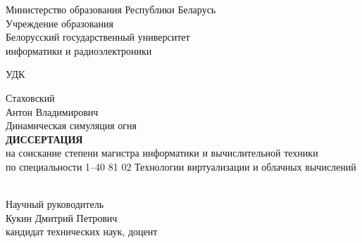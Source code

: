 \begin{titlepage}
    \begin{center}
        Министерство образования Республики Беларусь \\
        Учреждение образования \\
        Белорусский государственный университет \\
        информатики и радиоэлектроники \\[4em]
    \end{center}

    \begin{raggedright}
        \begin{minipage}{4cm}
            УДК\hrulefill{} \\[1em]
        \end{minipage}
    \end{raggedright}

    \begin{center}
        Стаховский \\
        Антон Владимирович \\[6em]

        Динамическая симуляция огня \\[3em]

        \MakeUppercase{\textbf{Диссертация}} \\
        на соискание степени магистра информатики и вычислительной техники \\
        по специальности 1--40 81 02 Технологии виртуализации и облачных вычислений \\ [4em]
    \end{center}

    \hfill
    \begin{raggedleft}
        \begin{minipage}{8cm}
            \hrulefill{} \\[1em]
            Научный руководитель \\[1em]
            Кукин Дмитрий Петрович \\[1em]
            кандидат технических наук, доцент \\[1em]
            \null\hrulefill{} \\[1em]
        \end{minipage}
    \end{raggedleft}


\end{titlepage}
